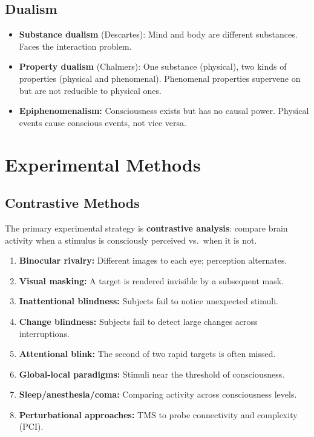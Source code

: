 \documentclass[11pt,a4paper]{report}
\begin{document}
\section{Dualism}

\begin{itemize}[leftmargin=1.5em]
  \item \textbf{Substance dualism} (Descartes): Mind and body are different substances. Faces the interaction problem.
  \item \textbf{Property dualism} (Chalmers): One substance (physical), two kinds of properties (physical and phenomenal). Phenomenal properties supervene on but are not reducible to physical ones.
  \item \textbf{Epiphenomenalism:} Consciousness exists but has no causal power. Physical events cause conscious events, not vice versa.
\end{itemize}


\chapter{Experimental Methods}

\section{Contrastive Methods}

The primary experimental strategy is \textbf{contrastive analysis}: compare brain activity when a stimulus is consciously perceived vs.\ when it is not.

\begin{mechbox}
\begin{enumerate}[leftmargin=1.5em]
  \item \textbf{Binocular rivalry:} Different images to each eye; perception alternates.
  \item \textbf{Visual masking:} A target is rendered invisible by a subsequent mask.
  \item \textbf{Inattentional blindness:} Subjects fail to notice unexpected stimuli.
  \item \textbf{Change blindness:} Subjects fail to detect large changes across interruptions.
  \item \textbf{Attentional blink:} The second of two rapid targets is often missed.
  \item \textbf{Global-local paradigms:} Stimuli near the threshold of consciousness.
  \item \textbf{Sleep/anesthesia/coma:} Comparing activity across consciousness levels.
  \item \textbf{Perturbational approaches:} TMS to probe connectivity and complexity (PCI).
\end{enumerate}
\end{mechbox}
\end{document}
